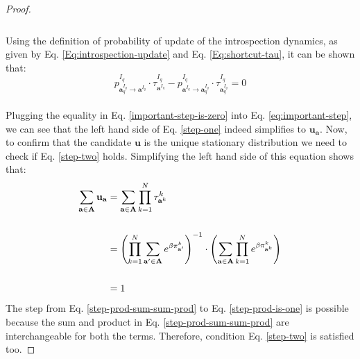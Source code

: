 \documentclass[11pt]{article}
\theoremstyle{plainCl1}
\theoremstyle{plainCl2}
\newcommand{\A}{\mathbf{A}}
\newcommand{\abf}{\mathbf{a}}
\newcommand{\ubf}{\mathbf{u}}
\begin{document}
\begin{proof}
\begin{align}
\end{align}
\\ Using the definition of probability of update of the introspection dynamics, as given by Eq. \ref{Eq:introspection-update} and Eq. \ref{Eq:shortcut-tau}, it can be shown that: 
\begin{equation}
p^{I_q}_{\abf^{I_q}_q \to \abf^{I_q}} \cdot \tau^{I_q}_{\abf^{I_q}} -  p^{I_q}_{\abf^{I_q} \to \abf^{I_q}_q} \cdot \tau^{I_q}_{\abf^{I_q}_q} = 0
\label{important-step-is-zero}
\end{equation}
\\ \noindent Plugging the equality in Eq. \ref{important-step-is-zero} into Eq. \ref{eq:important-step}, we can see that the left hand side of Eq. \ref{step-one} indeed simplifies to $\ubf_{\abf}$. Now, to confirm that the candidate $\ubf$ is the unique stationary distribution we need to check if Eq. \ref{step-two} holds. Simplifying the left hand side of this equation shows that:
\begin{align}
\sum_{\abf \in \A} \ubf_\abf &= \sum_{\abf \in \A} \prod_{k=1}^N \tau^k_{\abf^k} \\ \notag \\
\label{step-prod-sum-sum-prod}
&= \left( \prod_{k=1}^N \sum_{\abf' \in \A} \displaystyle e^{\beta \pi^k_{\abf'}}\right)^{-1} \cdot \left( \sum_{\abf \in \A} \prod_{k=1}^N \displaystyle e^{\beta \pi^k_{\abf^k}} \right) \\ \notag \\
\label{step-prod-is-one}
&= 1
\end{align}
\noindent The step from Eq. \ref{step-prod-sum-sum-prod} to Eq. \ref{step-prod-is-one} is possible because the sum and product in Eq. \ref{step-prod-sum-sum-prod} are interchangeable for both the terms. Therefore, condition Eq. \ref{step-two} is satisfied too. 
\end{proof}
\end{document}
